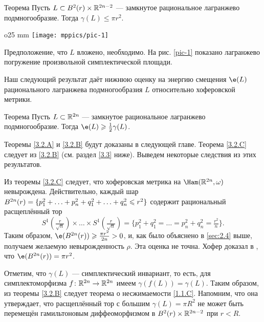 \begin{thm}[(\cite{S1})]{Теорема}\label{3.2.B}
  Пусть $L \subset B^2 (r) \times \mathbb{R}^{2n - 2}$ --- замкнутое
  рациональное лагранжево подмногообразие. 
  Тогда $\gamma (L) \le \pi r^2$.
\end{thm}

\begin{wrapfigure}[6]{o}{25 mm}
\vskip-3mm
\centering
\texttt{[image: mppics/pic-1]}
\caption{}\label{pic-1}
\vskip0mm
\end{wrapfigure}

Предположение, что $L$ вложено, необходимо.
На рис. \ref{pic-1} показано лагранжево погружение произвольной
симплектической площади.

Наш следующий результат даёт нижнюю оценку на энергию смещения $\e (L)$ рационального лагранжева подмногообразия $L$ относительно хоферовской метрики.

\begin{thm}{Теорема}\label{3.2.C}
  Пусть $L \subset \mathbb{R}^{2n}$ --- замкнутое рациональное лагранжево
  подмногообразие.
  Тогда $\e (L) \ge \tfrac12 \gamma (L)$.
\end{thm}

Теоремы \ref{3.2.A} и \ref{3.2.B} будут доказаны в следующей главе.
Теорема \ref{3.2.C} следует из \ref{3.2.B} (см. раздел \ref{3.3} ниже).
Выведем некоторые следствия из этих результатов.

\begin{ex}{}\label{3.2.D}
Из теоремы \ref{3.2.C} следует, что хоферовская метрика на $\Ham (\RR^{2n}, \omega)$ невырождена.
Действительно, каждый шар 
$B^{2n}(r) = \{p_1^2 +\z\dots\z+ p_n^2 \z+ q_1^2+\z\dots\z+ q_n^2 \le r^2\}$
содержит рациональный расщеплённый тор 
\[
S^1(\tfrac r{\sqrt{n}}) \times\dots\times S^1(\tfrac r{\sqrt{n}})
=
\{p_1^{2}+q_1^2=\dots=p_n^{2}+q_n^2=\tfrac{r^2}{n}\}.
\]
Таким образом, $\e (B^{2n} (r)) \ge \tfrac{\pi r^2}{2n}> 0$, и, как было объяснено в \ref{sec:2.4} выше, получаем желаемую невырожденность $\rho$.
Эта оценка не точна.
Хофер доказал в \cite{H1}, что $\e (B^{2n} (r)) = \pi r^2$.
\end{ex}

\begin{ex}{}\label{3.2.E} 
Отметим, что $\gamma (L)$ --- симплектический инвариант, то есть, для симплектоморфизма $f\colon \mathbb{R}^{2n} \to \mathbb{R}^{2n}$ имеем $\gamma (f (L)) = \gamma (L)$.
Таким образом, из теоремы \ref{3.2.B} следует теорема о несжимаемости \ref{1.1.C}.
Напомним, что она утверждает, что расщеплённый тор с большим $\gamma (L) = \pi R^2$ не может быть перемещён гамильтоновым диффеоморфизмом в $B^2 (r) \times \mathbb{R}^{2n - 2}$ при $r<R$.
\end{ex}

